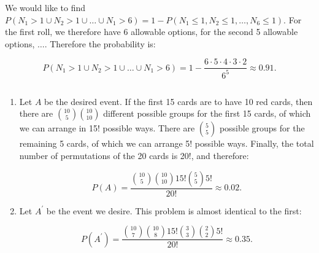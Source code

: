 \begin{problem}{15}  We would like to find $P(N_1 >1 \cup N_2 >1 \cup \ldots \cup N_1 >6) = 1- P(N_1 \le 1, N_2 \le 1, \ldots, N_6 \le 1)$.  For the first roll, we therefore have 6 allowable options, for the second 5 allowable options, $\ldots$.  Therefore the probability is:

\begin{equation*}
P(N_1 >1 \cup N_2 >1 \cup \ldots \cup N_1 >6) = 1- \frac{6\cdot5\cdot4\cdot3\cdot2}{6^5} \approx 0.91.
\end{equation*}

\end{problem}

\begin{problem}{16} $ $

\begin{enumerate}

\item
Let $A$ be the desired event.  If the first 15 cards are to have 10 red cards, then there are $\binom{10}{5} \binom{10}{10}$ different possible groups for the first 15 cards, of which we can arrange in 15! possible ways.  There are $\binom{5}{5}$ possible groups for the remaining 5 cards, of which we can arrange 5! possible ways.  Finally, the total number of permutations of the 20 cards is 20!, and therefore:

\begin{equation*}
P(A) = \frac{\binom{10}{5}\binom{10}{10}15!\binom{5}{5}5!}{20!}\approx 0.02.
\end{equation*}

\item
Let $A^\prime$ be the event we desire.  This problem is almost identical to the first:

\begin{equation*}
P(A^\prime) = \frac{\binom{10}{7}\binom{10}{8}15!\binom{3}{3}\binom{2}{2}5!}{20!}\approx 0.35.
\end{equation*}

\end{enumerate}

\end{problem}

